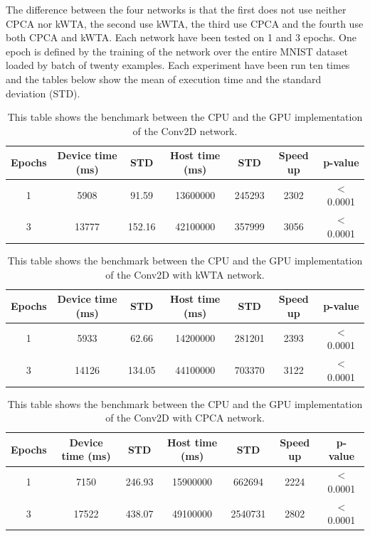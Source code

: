 \documentclass[11pt]{report}
\begin{document}
\noindent The difference between the four networks is that the first does not use neither CPCA nor kWTA, the second use kWTA, the third use CPCA and the fourth use both CPCA and kWTA. Each network have been tested on 1 and 3 epochs. One epoch is defined by the training of the network over the entire MNIST dataset loaded by batch of twenty examples. Each experiment have been run ten times and the tables below show the mean of execution time and the standard deviation (STD).

\begin{table}[h!]
\centering
\begin{tabular}{ c | c c | c c | c c }
Epochs & Device time (ms) & STD & Host time (ms) & STD & Speed up & p-value\\
\hline
1 & 5908  & 91.59  & 13600000 & 245293 & 2302 & $<$ 0.0001 \\
3 & 13777 & 152.16 & 42100000 & 357999 & 3056 & $<$ 0.0001
\end{tabular}
\caption[Speed benchmark: Conv2D network]{This table shows the benchmark between the CPU and the GPU implementation of the Conv2D network.}
\end{table}

\begin{table}[h!]
\centering
\begin{tabular}{ c | c c | c c | c c }
Epochs & Device time (ms) & STD & Host time (ms) & STD & Speed up & p-value\\
\hline
1 & 5933  & 62.66  & 14200000 & 281201 & 2393 & $<$ 0.0001 \\
3 & 14126 & 134.05 & 44100000 & 703370 & 3122 & $<$ 0.0001
\end{tabular}
\caption[Speed benchmark: Conv2D network with kWTA]{This table shows the benchmark between the CPU and the GPU implementation of the Conv2D with kWTA network.}
\end{table}

\begin{table}[h!]
\centering
\begin{tabular}{ c | c c | c c | c c }
Epochs & Device time (ms) & STD & Host time (ms) & STD & Speed up & p-value\\
\hline
1 & 7150  & 246.93 & 15900000 & 662694  & 2224 & $<$ 0.0001 \\
3 & 17522 & 438.07 & 49100000 & 2540731 & 2802 & $<$ 0.0001
\end{tabular}
\caption[Speed benchmark: Conv2D network with CPCA]{This table shows the benchmark between the CPU and the GPU implementation of the Conv2D with CPCA network.}
\end{table}
\end{document}
